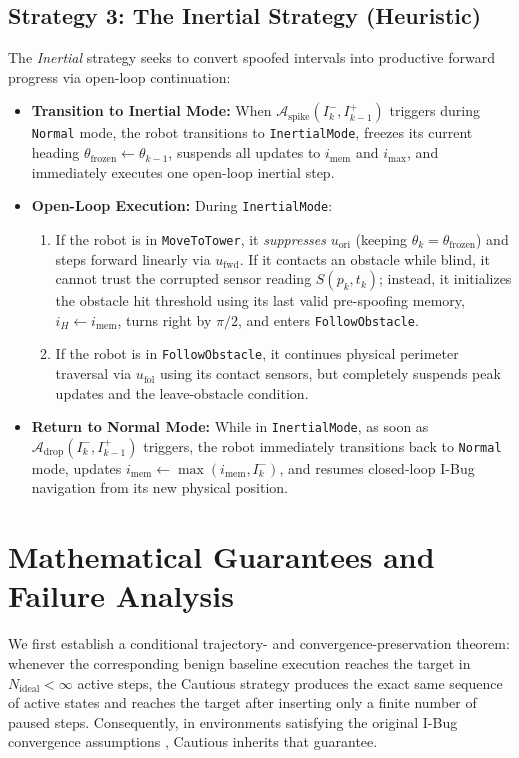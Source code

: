 \documentclass[12pt, a4paper]{article}
\begin{document}
\subsection{Strategy 3: The Inertial Strategy (Heuristic)}
The \textit{Inertial} strategy seeks to convert spoofed intervals into productive forward progress via open-loop continuation:
\begin{itemize}
    \item \textbf{Transition to Inertial Mode:} When $\mathcal{A}_{\text{spike}}(I_k^-, I_{k-1}^+)$ triggers during \texttt{Normal} mode, the robot transitions to \texttt{InertialMode}, freezes its current heading $\theta_{\text{frozen}} \leftarrow \theta_{k-1}$, suspends all updates to $i_{\text{mem}}$ and $i_{\text{max}}$, and immediately executes one open-loop inertial step.
    \item \textbf{Open-Loop Execution:} During \texttt{InertialMode}:
    \begin{enumerate}
        \item If the robot is in \texttt{MoveToTower}, it \emph{suppresses} $u_{\text{ori}}$ (keeping $\theta_k = \theta_{\text{frozen}}$) and steps forward linearly via $u_{\text{fwd}}$. If it contacts an obstacle while blind, it cannot trust the corrupted sensor reading $S(p_k, t_k)$; instead, it initializes the obstacle hit threshold using its last valid pre-spoofing memory, $i_H \leftarrow i_{\text{mem}}$, turns right by $\pi/2$, and enters \texttt{FollowObstacle}.
        \item If the robot is in \texttt{FollowObstacle}, it continues physical perimeter traversal via $u_{\text{fol}}$ using its contact sensors, but completely suspends peak updates and the leave-obstacle condition.
    \end{enumerate}
    \item \textbf{Return to Normal Mode:} While in \texttt{InertialMode}, as soon as $\mathcal{A}_{\text{drop}}(I_k^-, I_{k-1}^+)$ triggers, the robot immediately transitions back to \texttt{Normal} mode, updates $i_{\text{mem}} \leftarrow \max(i_{\text{mem}}, I_k^-)$, and resumes closed-loop I-Bug navigation from its new physical position.
\end{itemize}

\section{Mathematical Guarantees and Failure Analysis}
\label{sec:theory}

We first establish a conditional trajectory- and convergence-preservation theorem: whenever the corresponding benign baseline execution reaches the target in $N_{\text{ideal}} < \infty$ active steps, the Cautious strategy produces the exact same sequence of active states and reaches the target after inserting only a finite number of paused steps. Consequently, in environments satisfying the original I-Bug convergence assumptions \cite{taylor2014intensity}, Cautious inherits that guarantee.
\end{document}
